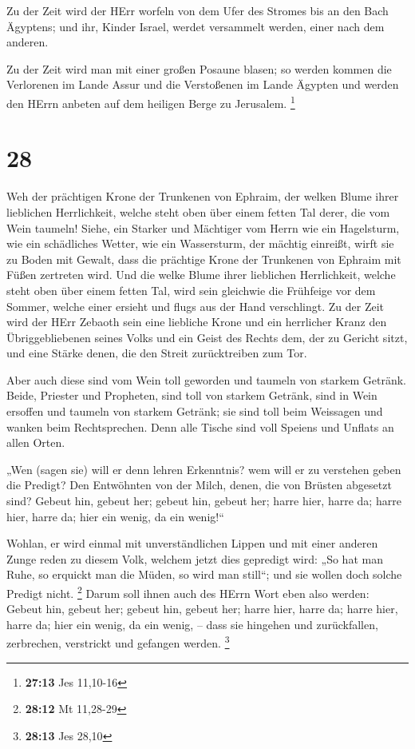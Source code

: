  Zu der Zeit wird der HErr worfeln von dem Ufer des Stromes
bis an den Bach Ägyptens; und ihr, Kinder Israel, werdet versammelt
werden, einer nach dem anderen.

 Zu der Zeit wird man mit einer großen Posaune blasen; so
werden kommen die Verlorenen im Lande Assur und die Verstoßenen im Lande
Ägypten und werden den HErrn anbeten auf dem heiligen Berge zu
Jerusalem. \footnote{\textbf{27:13} Jes 11,10-16}

\hypertarget{section-11}{%
\section{28}\label{section-11}}

 Weh der prächtigen Krone der Trunkenen von Ephraim, der
welken Blume ihrer lieblichen Herrlichkeit, welche steht oben über einem
fetten Tal derer, die vom Wein taumeln!  Siehe, ein Starker
und Mächtiger vom Herrn wie ein Hagelsturm, wie ein schädliches Wetter,
wie ein Wassersturm, der mächtig einreißt, wirft sie zu Boden mit
Gewalt,  dass die prächtige Krone der Trunkenen von Ephraim
mit Füßen zertreten wird.  Und die welke Blume ihrer
lieblichen Herrlichkeit, welche steht oben über einem fetten Tal, wird
sein gleichwie die Frühfeige vor dem Sommer, welche einer ersieht und
flugs aus der Hand verschlingt.  Zu der Zeit wird der HErr
Zebaoth sein eine liebliche Krone und ein herrlicher Kranz den
Übriggebliebenen seines Volks  und ein Geist des Rechts dem,
der zu Gericht sitzt, und eine Stärke denen, die den Streit
zurücktreiben zum Tor.

 Aber auch diese sind vom Wein toll geworden und taumeln von
starkem Getränk. Beide, Priester und Propheten, sind toll von starkem
Getränk, sind in Wein ersoffen und taumeln von starkem Getränk; sie sind
toll beim Weissagen und wanken beim Rechtsprechen.  Denn
alle Tische sind voll Speiens und Unflats an allen Orten.

 „Wen (sagen sie) will er denn lehren Erkenntnis? wem will
er zu verstehen geben die Predigt? Den Entwöhnten von der Milch, denen,
die von Brüsten abgesetzt sind?  Gebeut hin, gebeut her;
gebeut hin, gebeut her; harre hier, harre da; harre hier, harre da; hier
ein wenig, da ein wenig!{}``

 Wohlan, er wird einmal mit unverständlichen Lippen und mit
einer anderen Zunge reden zu diesem Volk, welchem jetzt dies gepredigt
wird:  „So hat man Ruhe, so erquickt man die Müden, so wird
man still``; und sie wollen doch solche Predigt nicht. \footnote{\textbf{28:12}
  Mt 11,28-29}  Darum soll ihnen auch des HErrn Wort eben
also werden: Gebeut hin, gebeut her; gebeut hin, gebeut her; harre hier,
harre da; harre hier, harre da; hier ein wenig, da ein wenig, -- dass
sie hingehen und zurückfallen, zerbrechen, verstrickt und gefangen
werden. \footnote{\textbf{28:13} Jes 28,10}

